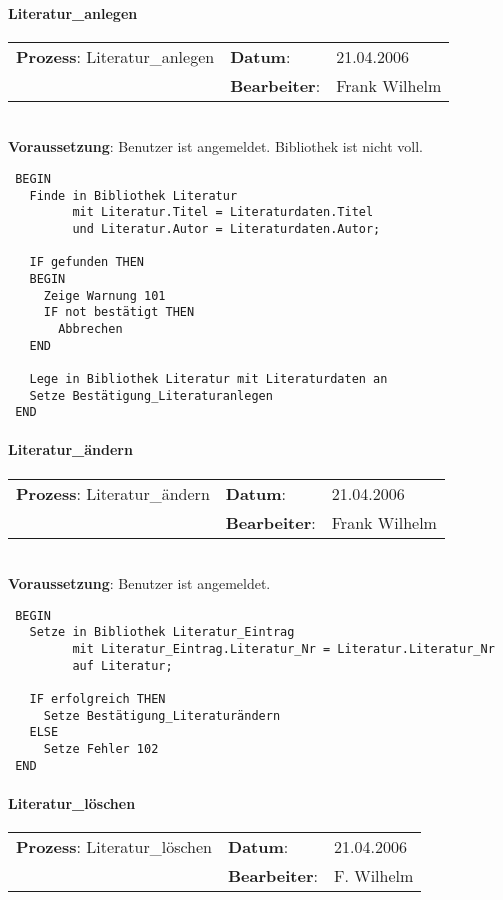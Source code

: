 \paragraph{Literatur\_anlegen}
\begin{tabular}[t]{p{9.5cm}ll}
\textbf{Prozess}: Literatur\_anlegen  	&\textbf{Datum}:      &21.04.2006\\
					&\textbf{Bearbeiter}: &Frank Wilhelm\\
\end{tabular}

\hrulefill\\
\textbf{Voraussetzung}: Benutzer ist angemeldet. Bibliothek ist nicht voll.
\begin{verbatim}
 BEGIN
   Finde in Bibliothek Literatur
         mit Literatur.Titel = Literaturdaten.Titel
         und Literatur.Autor = Literaturdaten.Autor;
 
   IF gefunden THEN
   BEGIN
     Zeige Warnung 101
     IF not bestätigt THEN
       Abbrechen
   END
   
   Lege in Bibliothek Literatur mit Literaturdaten an
   Setze Bestätigung_Literaturanlegen
 END
\end{verbatim}
\hrulefill



\paragraph{Literatur\_ändern}
\begin{tabular}[t]{p{9.5cm}ll}
\textbf{Prozess}: Literatur\_ändern  	&\textbf{Datum}:      &21.04.2006\\
					&\textbf{Bearbeiter}: &Frank Wilhelm\\
\end{tabular}

\hrulefill\\
\textbf{Voraussetzung}: Benutzer ist angemeldet.
\begin{verbatim}
 BEGIN
   Setze in Bibliothek Literatur_Eintrag
         mit Literatur_Eintrag.Literatur_Nr = Literatur.Literatur_Nr
         auf Literatur;
  
   IF erfolgreich THEN
     Setze Bestätigung_Literaturändern
   ELSE
     Setze Fehler 102
 END
\end{verbatim}
\hrulefill



\paragraph{Literatur\_löschen}
\begin{tabular}[t]{p{9.5cm}ll}
\textbf{Prozess}: Literatur\_löschen  	&\textbf{Datum}:      &21.04.2006\\
					&\textbf{Bearbeiter}: &F. Wilhelm\\
\end{tabular}

